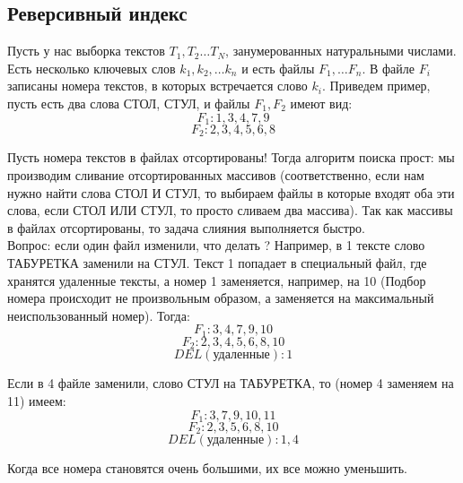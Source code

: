 \subsection {Реверсивный индекс}
Пусть у нас выборка текстов $T_1, T_2 \dots T_{N}$, занумерованных натуральными числами. Есть несколько ключевых слов $k_1, k_2, \dots k_n$ и есть файлы $F_1, \dots F_n$. В файле $F_i$ записаны номера текстов, в которых встречается слово $k_i$. Приведем пример, пусть есть два слова СТОЛ, СТУЛ, и файлы $F_1, F_2$  имеют вид: \\
$$ F_1: 1,3,4,7,9 $$
$$ F_2: 2,3,4,5,6,8 $$

Пусть номера текстов в файлах отсортированы!
Тогда алгоритм поиска прост: мы производим сливание отсортированных массивов (соответственно, если нам нужно найти слова СТОЛ И СТУЛ, то выбираем файлы в которые входят оба эти слова, если  СТОЛ ИЛИ СТУЛ, то просто сливаем два массива). Так как массивы в файлах отсортированы, то задача слияния выполняется быстро.\\
Вопрос: если один файл изменили, что делать ? Например, в 1 тексте слово ТАБУРЕТКА заменили на СТУЛ. Текст 1 попадает в специальный файл, где хранятся удаленные тексты, а номер 1 заменяется, например, на 10 (Подбор номера происходит не произвольным образом, а заменяется на максимальный неиспользованный номер). Тогда:
$$ F_1: 3,4,7,9, 10 $$
$$ F_2: 2,3,4,5,6,8,10 $$
$$DEL (\text{удаленные}): 1$$

Если в 4 файле заменили, слово СТУЛ на ТАБУРЕТКА, то (номер 4 заменяем на 11) имеем:
$$ F_1: 3,7,9, 10, 11 $$
$$ F_2: 2,3,5,6,8,10 $$
$$DEL (\text{удаленные}): 1, 4$$

Когда все номера становятся очень большими, их все можно уменьшить.
